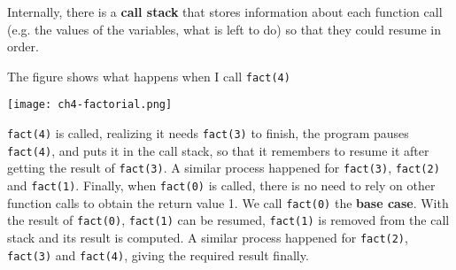 Internally, there is a \textbf{call stack} that stores information about each function call (e.g. the values of the variables, what is left to do) so that they could resume in order.

The figure shows what happens when I call \texttt{fact(4)}

\texttt{[image: ch4-factorial.png]}

\texttt{fact(4)} is called, realizing it needs \texttt{fact(3)} to finish, the program pauses \texttt{fact(4)}, and puts it in the call stack, so that it remembers to resume it after getting the result of \texttt{fact(3)}. A similar process happened for \texttt{fact(3)}, \texttt{fact(2)} and \texttt{fact(1)}. Finally, when \texttt{fact(0)} is called, there is no need to rely on other function calls to obtain the return value 1. We call \texttt{fact(0)} the \textbf{base case}. With the result of \texttt{fact(0)}, \texttt{fact(1)} can be resumed, \texttt{fact(1)} is removed from the call stack and its result is computed. A similar process happened for \texttt{fact(2)}, \texttt{fact(3)} and \texttt{fact(4)}, giving the required result finally.
